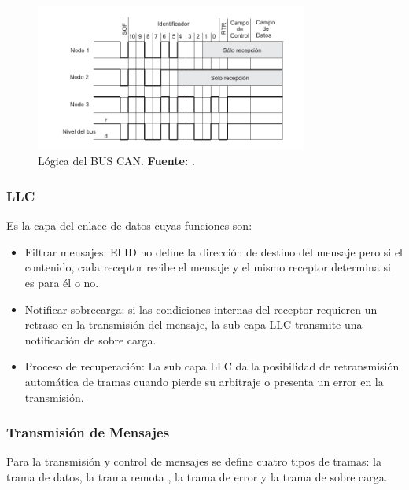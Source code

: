 \begin{figure}[H]
	\centering
		\includegraphics[width=0.8\textwidth]{./Cap2imagen/logicacan.pdf}
	\caption[Lógica del BUS CAN.]{Lógica del BUS CAN.\textbf{ Fuente:} \cite{PSMR}.}
	\label{LID} %
\end{figure}


\subsubsection {LLC}
Es la capa del enlace de datos cuyas funciones son:

\begin {itemize}
\item Filtrar mensajes: El ID no define la dirección de destino del mensaje pero si el contenido, cada receptor recibe el mensaje y el mismo receptor determina si es para él o no.
\item Notificar sobrecarga: si las condiciones internas del receptor requieren un retraso en la transmisión del mensaje, la sub capa LLC transmite una notificación de sobre carga.
\item Proceso de recuperación: La sub capa LLC da la posibilidad de retransmisión automática de tramas cuando pierde su arbitraje o presenta un error en la transmisión.
\end{itemize}

\subsubsection {Transmisión de Mensajes}
Para la transmisión y control de mensajes se define cuatro tipos de tramas: la trama de datos, la trama remota , la trama de error y la trama de sobre carga.

